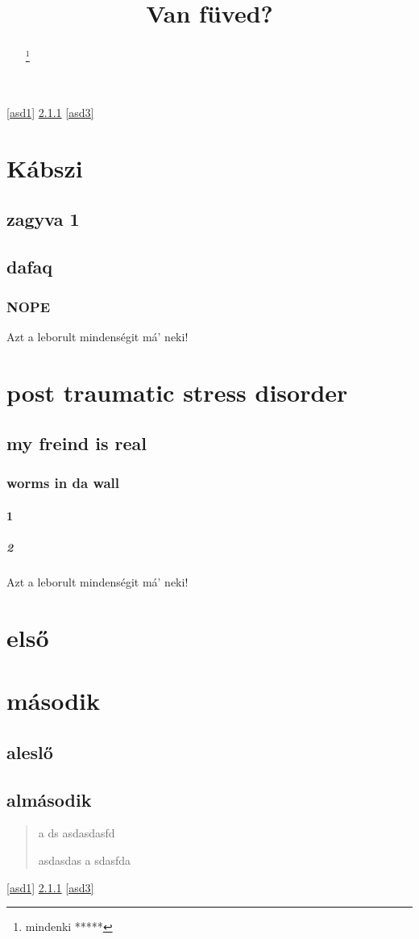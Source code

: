 \documentclass[twoside]{article}
\title{Van füved?}
\begin{document}
\maketitle
\begin{abstract}
\texttt{\lipsum[3-4]}
\renewcommand{\thefootnote}{\fnsymbol{footnote}}
\footnote{mindenki *****}
\end{abstract}
\ref{asd1}
\ref{asd2}
\ref{asd3}
\setcounter{secnumdepth}{10}
\setcounter{tocdepth}{10}
\renewcommand{\contentsname}{MI FOLYIK ITT GYÖNGYÖSÖN!?}
\tableofcontents
\clearpage
{}
\section{Kábszi}
\subsection{zagyva 1}
\hulipsum[3]
\subsection{dafaq}
\hulipsum[4]
\label{asd1}
\subsubsection{NOPE}
\hulipsum[1]
\marginparwidth 3cm
\marginparsep 0.5cm
Azt a leborult mindenségit má' neki!
\section[ptsd]{post traumatic stress disorder}
\subsection{my freind is real}
\subsubsection{worms in da wall}
\label{asd2}
\paragraph{1}
\subparagraph{2}
\marginparwidth 3cm
\marginparsep 0.5cm
Azt a leborult mindenségit má' neki!
\hulipsum[2]
\quote
\lipsum[5-6]
\quotation
\hulipsum[6-7]
\tableofcontents
\label{asd3}
\appendix
\section{első}
\section{második}
\subsection{aleslő}
\subsection{almásodik}
\begin{verse}
a
ds
asdasdasfd
\newline

asdasdas
a
sdasfda
\end{verse}
\ref{asd1}
\ref{asd2}
\ref{asd3}
\end{document}

